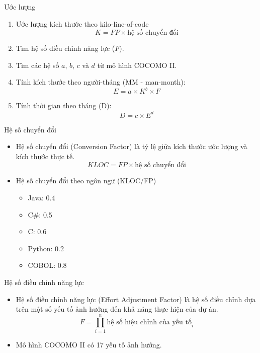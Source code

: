 \begin{frame}{Ước lượng}
    \begin{block}{}
        \begin{enumerate}
            \item Ước lượng kích thước theo kilo-line-of-code
            \[K = FP \times \text{hệ số chuyển đổi}\]
            \item Tìm hệ số điều chỉnh năng lực ($F$).
            \item Tìm các hệ số $a$, $b$, $c$ và $d$ từ mô hình COCOMO II.
            \item Tính kích thước theo người-tháng (MM - man-month):
            \[E = a \times K^b \times F\]
            \item Tính thời gian theo tháng (D):
            \[D = c \times E^d\]
        \end{enumerate}
    \end{block}
\end{frame}

\begin{frame}{Hệ số chuyển đổi}
    \begin{block}{}
        \begin{itemize}
            \item Hệ số chuyển đổi (Conversion Factor) là tỷ lệ
            giữa kích thước ước lượng và kích thước thực tế.
            \[KLOC = FP \times \text{hệ số chuyển đổi}\]
            \item Hệ số chuyển đổi theo ngôn ngữ (KLOC/FP)
            \begin{itemize}
                \item Java: 0.4
                \item C\#: 0.5
                \item C: 0.6
                \item Python: 0.2
                \item COBOL: 0.8
            \end{itemize}
        \end{itemize}
    \end{block}
\end{frame}

\begin{frame}{Hệ số điều chỉnh năng lực}
    \begin{block}{}
        \begin{itemize}
            \item Hệ số điều chỉnh năng lực (Effort Adjustment Factor) là
            hệ số điều chỉnh dựa trên một số yếu tố ảnh hưởng
            đến khả năng thực hiện của dự án.
            \[F = \prod_{i=1}^n \text{hệ số hiệu chỉnh của yếu tố}_i\]
            \item Mô hình COCOMO II có 17 yếu tố ảnh hưởng.
        \end{itemize}
    \end{block}
\end{frame}

